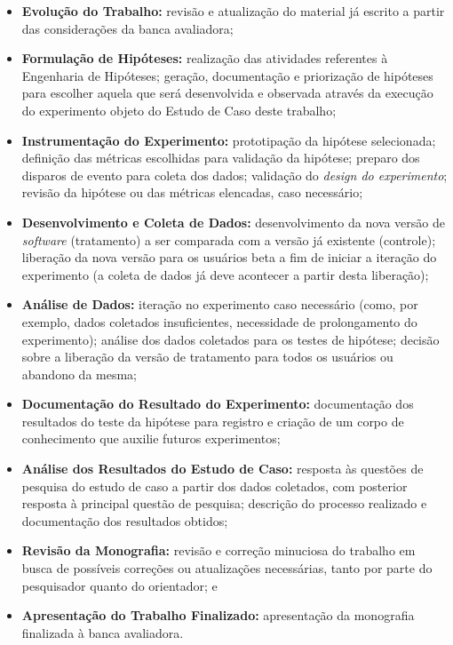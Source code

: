 \begin{itemize}
    \item \textbf{Evolução do Trabalho:} revisão e atualização do material já escrito a partir das considerações da banca avaliadora;
    \item \textbf{Formulação de Hipóteses:} realização das atividades referentes à Engenharia de Hipóteses; geração, documentação e priorização de hipóteses para escolher aquela que será desenvolvida e observada através da execução do experimento objeto do Estudo de Caso deste trabalho;
    \item \textbf{Instrumentação do Experimento:} prototipação da hipótese selecionada; definição das métricas escolhidas para validação da hipótese; preparo dos disparos de evento para coleta dos dados; validação do \textit{design do experimento}; revisão da hipótese ou das métricas elencadas, caso necessário;
    \item \textbf{Desenvolvimento e Coleta de Dados:} desenvolvimento da nova versão de \textit{software} (tratamento) a ser comparada com a versão já existente (controle); liberação da nova versão para os usuários beta a fim de iniciar a iteração do experimento (a coleta de dados já deve acontecer a partir desta liberação);
    \item \textbf{Análise de Dados:} iteração no experimento caso necessário (como, por exemplo, dados coletados insuficientes, necessidade de prolongamento do experimento); análise dos dados coletados para os testes de hipótese; decisão sobre a liberação da versão de tratamento para todos os usuários ou abandono da mesma;
    \item \textbf{Documentação do Resultado do Experimento:} documentação dos resultados do teste da hipótese para registro e criação de um corpo de conhecimento que auxilie futuros experimentos;
    \item \textbf{Análise dos Resultados do Estudo de Caso:} resposta às questões de pesquisa do estudo de caso a partir dos dados coletados, com posterior resposta à principal questão de pesquisa; descrição do processo realizado e documentação dos resultados obtidos;
    \item \textbf{Revisão da Monografia:} revisão e correção minuciosa do trabalho em busca de possíveis correções ou atualizações necessárias, tanto por parte do pesquisador quanto do orientador; e
    \item \textbf{Apresentação do Trabalho Finalizado:} apresentação da monografia finalizada à banca avaliadora.
\end{itemize}



